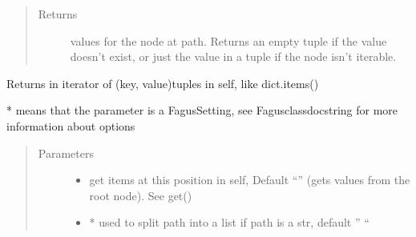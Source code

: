 \documentclass[a4paper,10pt,english]{sphinxmanual}
\begin{document}
\begin{fulllineitems}
\begin{fulllineitems}
\begin{quote}
\begin{description}
\begin{itemize}
\end{itemize}

\item[{Returns}] \leavevmode
\sphinxAtStartPar
values for the node at path. Returns an empty tuple if the value doesn’t exist, or just the value in a
tuple if the node isn’t iterable.

\end{description}\end{quote}

\end{fulllineitems}


\begin{fulllineitems}
\label{\detokenize{fagus.fagus:fagus.fagus.Fagus.items}}
\pysigstartsignatures
{}
\pysigstopsignatures
\sphinxAtStartPar
Returns in iterator of (key, value)\sphinxhyphen{}tuples in self, like dict.items()

\sphinxAtStartPar
* means that the parameter is a Fagus\sphinxhyphen{}Setting, see Fagus\sphinxhyphen{}class\sphinxhyphen{}docstring for more information about options
\begin{quote}\begin{description}
\item[{Parameters}] \leavevmode\begin{itemize}
\item {}
\sphinxAtStartPar
{} \textendash{} get items at this position in self, Default “” (gets values from the root node). See get()

\item {}
\sphinxAtStartPar
{} \textendash{} * used to split path into a list if path is a str, default ” “


\end{itemize}
\end{description}
\end{quote}
\end{fulllineitems}
\end{fulllineitems}
\end{document}
